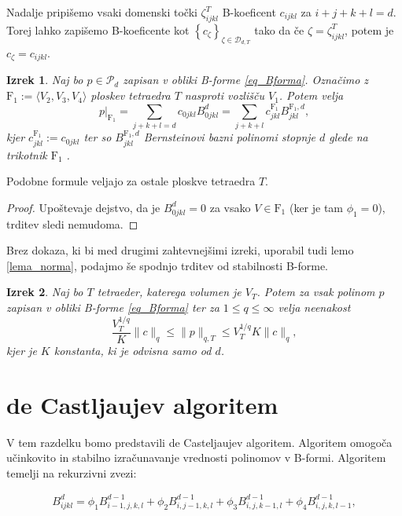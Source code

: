 \documentclass[11pt,a4paper]{article}
\newtheorem{theorem}{Izrek}
\begin{document}
Nadalje pripišemo vsaki domenski točki $\zeta_{ijkl}^T$ B-koeficent
$c_{ijkl}$ za $i +j+k+l = d$. Torej lahko zapišemo B-koeficente kot $\left\{
    c_{\zeta}
\right\}_{\zeta \in \mathcal{D}_{d,T}}$ tako da če $\zeta = \zeta_{ijkl}^T$,
potem je $c_{\zeta} = c_{ijkl}$.

\begin{theorem}
    Naj bo $p \in \mathcal{P}_d$ zapisan v obliki B-forme \eqref{eq_Bforma}. Označimo 
    z $\text{F}_1 := \langle V_2,V_3,V_4 \rangle$ ploskev tetraedra $T$ nasproti vozlišču $V_1$.
    Potem velja 
    \begin{equation*}
        p|_{\text{F}_1} = \sum_{j+k+l = d} c_{0jkl}B_{0jkl}^d = 
            \sum_{j+k+l}c_{jkl}^{\text{F}_1} B_{jkl}^{\text{F}_1,d},
    \end{equation*}
    kjer $c_{jkl}^{\text{F}_1}:=c_{0jkl}$ ter so $B_{jkl}^{\text{F}_1,d}$
    Bernsteinovi bazni polinomi stopnje $d$ glede na trikotnik $\text{F}_1$ .
\end{theorem}

Podobne formule veljajo za ostale ploskve tetraedra $T$.

\begin{proof}
    Upoštevaje dejstvo, da je $B_{0jkl}^d = 0$ za vsako $V \in \text{F}_1$ (ker je 
    tam $\phi_1 = 0$), trditev sledi nemudoma.
\end{proof}

Brez dokaza, ki bi med drugimi zahtevnejšimi izreki, uporabil 
tudi lemo \ref{lema_norma},
podajmo še spodnjo trditev od stabilnosti B-forme.
\begin{theorem}
    Naj bo $T$ tetraeder, katerega volumen je $V_T$. Potem za vsak
    polinom $p$ zapisan v obliki B-forme \eqref{eq_Bforma} ter za $1 \leq q \leq \infty$
    velja neenakost
    \[
    \frac{V_T^{1/q}}{K} \| c \|_q \leq \| p \|_{q,T} \leq V_T^{1/q} K \| c \|_q,
    \]
    kjer je $K$ konstanta, ki je odvisna samo od $d$.
\end{theorem}

\section{de Castljaujev algoritem}

V tem razdelku bomo predstavili de Casteljaujev algoritem. Algoritem omogoča učinkovito in stabilno izračunavanje vrednosti polinomov v B-formi. Algoritem temelji na rekurzivni zvezi:

\begin{align*}
 B_{ijkl}^d = \phi_1 B_{i-1,j,k,l}^{d-1} + \phi_2 B_{i,j-1,k,l}^{d-1} + \phi_3 B_{i,j,k-1,l}^{d-1} + \phi_4 B_{i,j,k,l-1}^{d-1}, 
\end{align*}
\end{document}
